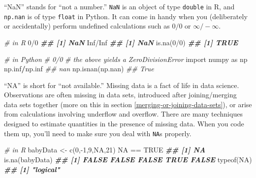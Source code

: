 \documentclass[
  12pt,
  krantz2]{krantz}
\makeatletter
\newenvironment{Shaded}{\begin{snugshade}}{\end{snugshade}}
\newcommand{\CommentTok}[1]{\textcolor[rgb]{0.37,0.37,0.37}{\textit{#1}}}
\newcommand{\ConstantTok}[1]{\textcolor[rgb]{0,0,0}{#1}}
\newcommand{\DecValTok}[1]{\textcolor[rgb]{0.06,0.06,0.06}{#1}}
\newcommand{\DocumentationTok}[1]{\textcolor[rgb]{0.37,0.37,0.37}{\textbf{\textit{#1}}}}
\newcommand{\FunctionTok}[1]{\textcolor[rgb]{0,0,0}{#1}}
\newcommand{\ImportTok}[1]{#1}
\newcommand{\NormalTok}[1]{#1}
\newcommand{\OperatorTok}[1]{\textcolor[rgb]{0.43,0.43,0.43}{\textbf{#1}}}
\newcommand{\OtherTok}[1]{\textcolor[rgb]{0.37,0.37,0.37}{#1}}
\newcommand{\SpecialCharTok}[1]{\textcolor[rgb]{0,0,0}{#1}}
\newenvironment{kframe}{%
\medskip{}
\setlength{\fboxsep}{.8em}
 \def\at@end@of@kframe{}%
 \ifinner\ifhmode%
  \def\at@end@of@kframe{\end{minipage}}%
  \begin{minipage}{\columnwidth}%
 \fi\fi%
 \def\FrameCommand##1{\hskip\@totalleftmargin \hskip-\fboxsep
 \colorbox{shadecolor}{##1}\hskip-\fboxsep
     \hskip-\linewidth \hskip-\@totalleftmargin \hskip\columnwidth}%
 \MakeFramed {\advance\hsize-\width
   \@totalleftmargin\z@ \linewidth\hsize
   \@setminipage}}%
 {\par\unskip\endMakeFramed%
 \at@end@of@kframe}
\renewenvironment{Shaded}{\begin{kframe}}{\end{kframe}}
\makeatother
\begin{document}
``NaN'' stands for ``not a number.'' \texttt{NaN} is an object of type \texttt{double} in R, and \texttt{np.nan} is of type \texttt{float} in Python. It can come in handy when you (deliberately or accidentally) perform undefined calculations such as \(0/0\) or \(\infty / -\infty\).

\begin{Shaded}
\begin{Highlighting}[]
\CommentTok{\# in R}
\DecValTok{0}\SpecialCharTok{/}\DecValTok{0}
\DocumentationTok{\#\# [1] NaN}
\ConstantTok{Inf}\SpecialCharTok{/}\ConstantTok{Inf}
\DocumentationTok{\#\# [1] NaN}
\FunctionTok{is.na}\NormalTok{(}\DecValTok{0}\SpecialCharTok{/}\DecValTok{0}\NormalTok{)}
\DocumentationTok{\#\# [1] TRUE}
\end{Highlighting}
\end{Shaded}

\begin{Shaded}
\begin{Highlighting}[]
\CommentTok{\# in Python}
\CommentTok{\# 0/0 }
\CommentTok{\# the above yields a ZeroDivisionError}
\ImportTok{import}\NormalTok{ numpy }\ImportTok{as}\NormalTok{ np}
\NormalTok{np.inf}\OperatorTok{/}\NormalTok{np.inf}
\CommentTok{\#\# nan}
\NormalTok{np.isnan(np.nan)}
\CommentTok{\#\# True}
\end{Highlighting}
\end{Shaded}

``NA'' is short for ``not available.'' Missing data is a fact of life in data science. Observations are often missing in data sets, introduced after joining/merging data sets together (more on this in section \ref{merging-or-joining-data-sets}), or arise from calculations involving underflow and overflow. There are many techniques designed to estimate quantities in the presence of missing data. When you code them up, you'll need to make sure you deal with \texttt{NA}s properly.

\begin{Shaded}
\begin{Highlighting}[]
\CommentTok{\# in R}
\NormalTok{babyData }\OtherTok{\textless{}{-}} \FunctionTok{c}\NormalTok{(}\DecValTok{0}\NormalTok{,}\SpecialCharTok{{-}}\DecValTok{1}\NormalTok{,}\DecValTok{9}\NormalTok{,}\ConstantTok{NA}\NormalTok{,}\DecValTok{21}\NormalTok{)}
\ConstantTok{NA} \SpecialCharTok{==} \ConstantTok{TRUE} 
\DocumentationTok{\#\# [1] NA}
\FunctionTok{is.na}\NormalTok{(babyData)}
\DocumentationTok{\#\# [1] FALSE FALSE FALSE  TRUE FALSE}
\FunctionTok{typeof}\NormalTok{(}\ConstantTok{NA}\NormalTok{)}
\DocumentationTok{\#\# [1] "logical"}
\end{Highlighting}
\end{Shaded}
\end{document}
